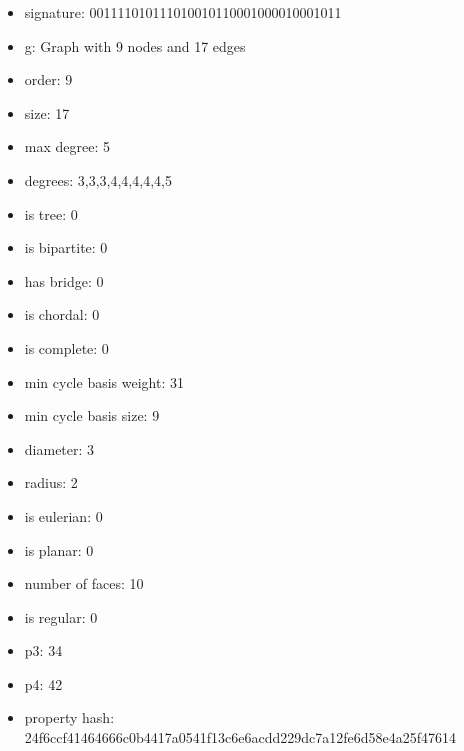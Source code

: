 \newpage
\begin{figure}
\end{figure}
\begin{itemize}
\item signature: 001111010111010010110001000010001011
\item g: Graph with 9 nodes and 17 edges
\item order: 9
\item size: 17
\item max degree: 5
\item degrees: 3,3,3,4,4,4,4,4,5
\item is tree: 0
\item is bipartite: 0
\item has bridge: 0
\item is chordal: 0
\item is complete: 0
\item min cycle basis weight: 31
\item min cycle basis size: 9
\item diameter: 3
\item radius: 2
\item is eulerian: 0
\item is planar: 0
\item number of faces: 10
\item is regular: 0
\item p3: 34
\item p4: 42
\item property hash: 24f6ccf41464666c0b4417a0541f13c6e6acdd229dc7a12fe6d58e4a25f47614
\end{itemize}
